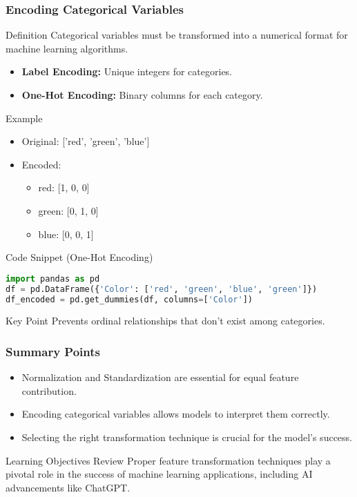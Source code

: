 \documentclass[aspectratio=169]{beamer}
\begin{document}
\begin{frame}[fragile]
    \frametitle{Encoding Categorical Variables}
    \begin{block}{Definition}
        Categorical variables must be transformed into a numerical format for machine learning algorithms.
    \end{block}
    \begin{itemize}
        \item \textbf{Label Encoding:} Unique integers for categories.
        \item \textbf{One-Hot Encoding:} Binary columns for each category.
    \end{itemize}
    \begin{block}{Example}
        \begin{itemize}
            \item Original: ['red', 'green', 'blue']
            \item Encoded:
            \begin{itemize}
                \item red: [1, 0, 0]
                \item green: [0, 1, 0]
                \item blue: [0, 0, 1]
            \end{itemize}
        \end{itemize}
    \end{block}
    \begin{block}{Code Snippet (One-Hot Encoding)}
        \begin{lstlisting}[language=Python]
import pandas as pd
df = pd.DataFrame({'Color': ['red', 'green', 'blue', 'green']})
df_encoded = pd.get_dummies(df, columns=['Color'])
        \end{lstlisting}
    \end{block}
    \begin{block}{Key Point}
        Prevents ordinal relationships that don’t exist among categories.
    \end{block}
\end{frame}

\begin{frame}[fragile]
    \frametitle{Summary Points}
    \begin{itemize}
        \item Normalization and Standardization are essential for equal feature contribution.
        \item Encoding categorical variables allows models to interpret them correctly.
        \item Selecting the right transformation technique is crucial for the model's success.
    \end{itemize}
    \begin{block}{Learning Objectives Review}
        Proper feature transformation techniques play a pivotal role in the success of machine learning applications, including AI advancements like ChatGPT.
    \end{block}
\end{frame}
\end{document}
